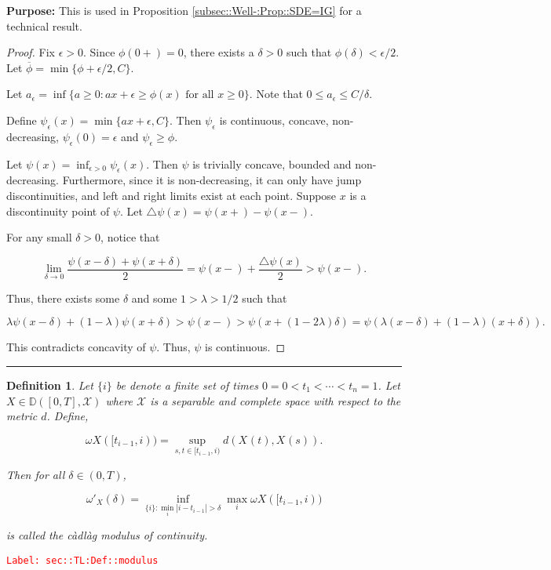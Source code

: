 \documentclass[12pt]{article}
\newcommand{\mb}{\mathbb}
\newcommand{\mc}{\mathcal}
\newcommand{\ra}{\rightarrow}
\newcommand{\ov}{\overline}
\newcommand{\te}{\text}
\newcommand{\ep}{\epsilon}
\newcommand{\tr}{\textcolor{red}}
\newcommand{\labe}[1]{\tr{\texttt{Label: #1}}}
\newcommand{\purpose}{\textbf{Purpose: }}
\newcommand{\ind}{\hspace{24pt}}
\newcommand{\lin}{\rule{\linewidth}{0.4 pt}}
\newcommand{\cad}{\mb{D}}							%
\newcommand{\x}{x}								%
\renewcommand{\t}{t}							%
\renewcommand{\tt}{s}							%
\newcommand{\X}{X}								%
\newcommand{\cind}[1]{_{#1}}					%
\newcommand{\tp}[1]{(#1)}						%
\newcommand{\rate}{\lambda}						%
\newcommand{\modu}{\omega}						%
\newcommand{\cmodu}{\omega'}					%
\newcommand{\pra}[1]{_{#1}}						%
\newcommand{\indx}[1]{_{#1}}					%
\newcommand{\spce}{\mc{X}}						%
\newtheorem{defn}[thms]{Definition}
\begin{document}
\purpose This is used in Proposition \ref{subsec::Well-:Prop::SDE=IG} for a technical result.

\begin{proof}
Fix \(\ep > 0\). Since \(\phi(0+) = 0\), there exists a \(\delta > 0\) such that \(\phi(\delta) < \ep/2\). Let \(\ov{\phi} = \min\{\phi+\ep/2, C\}\).

\ind Let \(a_\ep = \inf\{a \geq 0: a\x + \ep \geq \phi(\x)\te{ for all } \x\geq 0\}\). Note that \(0\leq a_\ep \leq C/\delta\). 

\ind Define \(\psi_\ep(\x) = \min\{a\x+\ep,C\}\). Then \(\psi_\ep\) is continuous, concave, non-decreasing, \(\psi_\ep(0) = \ep\) and \(\psi_\ep \geq \phi\).

\ind Let \(\psi(\x) = \inf_{\ep > 0} \psi_\ep(\x)\). Then \(\psi\) is trivially concave, bounded and non-decreasing. Furthermore, since it is non-decreasing, it can only have jump discontinuities, and left and right limits exist at each point. Suppose \(\x\) is a discontinuity point of \(\psi\). Let \(\triangle\psi(\x) = \psi(\x+) - \psi(\x-)\).

For any small \(\delta > 0\), notice that

\[\lim_{\delta \ra 0} \frac{\psi(\x-\delta) + \psi(\x+\delta)}{2} = \psi(\x-) + \frac{\triangle\psi(\x)}{2} > \psi(\x-).\]

Thus, there exists some \(\delta\) and some \(1>\rate>1/2\) such that

\[\rate\psi(\x-\delta) + (1 -\rate)\psi(\x+\delta) > \psi(\x-) > \psi(\x + (1 - 2\rate)\delta) = \psi\left(\rate(\x-\delta) + (1 - \rate)(\x+\delta)\right).\]

This contradicts concavity of \(\psi\). Thus, \(\psi\) is continuous.
\end{proof}

\lin

\begin{defn}
Let \(\{	{i}\}\) be denote a finite set of times \(0=	{0} <\t\indx{1} <\cdots < \t\indx{n}=1\). Let \(\X\in \cad([0,T],\spce)\) where \(\spce\) is a separable and complete space with respect to the metric \(d\). Define,

\[\modu{\X}([\t\indx{i-1},	{i})) = \sup_{\tt,\t\in [\t\indx{i-1},	{i})} d(\X\cind{}\tp{\t},\X\cind{}\tp{\tt}).\]

Then for all \(\delta \in (0,T)\),

\[\cmodu\pra{\X}(\delta) = \inf_{\{	{i}\}: \min_i |	{i} - \t\indx{i-1}| > \delta} \max_{i} \modu{\X}([\t\indx{i-1},	{i}))\]

is called the c\`adl\`ag modulus of continuity.
\label{sec::TL:Def::modulus}
\end{defn}
\labe{sec::TL:Def::modulus}
\end{document}
